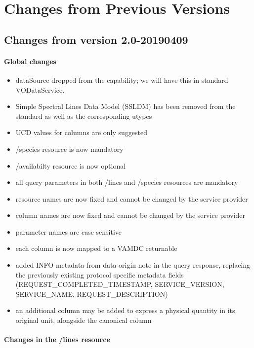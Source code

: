 \documentclass[11pt,a4paper]{ivoa}
\begin{document}
\section{Changes from Previous Versions}

\subsection{Changes from version 2.0-20190409}
\paragraph{Global changes}
\begin{itemize}
\item dataSource dropped from the capability; we will have this in
standard VODataService.
\item Simple Spectral Lines Data Model (SSLDM) has been removed from the standard as well 
as the corresponding utypes
\item UCD values for columns are only suggested
\item /species resource is now mandatory
\item /availabilty resource is now optional
\item all query parameters in both /lines and /species resources are mandatory
\item resource names are now fixed and cannot be changed by the service provider
\item column names are now fixed and cannot be changed by the service provider
\item parameter names are case sensitive
\item each column is now mapped to a VAMDC returnable
\item added INFO metadata from data origin note in the query response, replacing the previously 
existing protocol specific metadata fields 
(REQUEST\_COMPLETED\_TIMESTAMP, SERVICE\_VERSION, SERVICE\_NAME, REQUEST\_DESCRIPTION)
\item an additional column may be added to express a physical quantity in its original unit, 
alongside the canonical column
\end{itemize}

\paragraph{Changes in the /lines resource}
\end{document}
